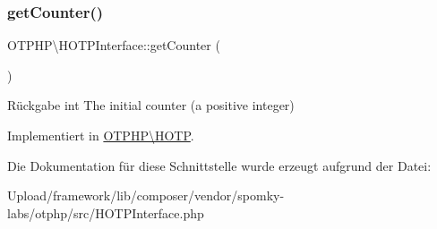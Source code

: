 \subsubsection{\texorpdfstring{get\+Counter()}{getCounter()}}
{\footnotesize\ttfamily O\+T\+P\+H\+P\textbackslash{}\+H\+O\+T\+P\+Interface\+::get\+Counter (\begin{DoxyParamCaption}{ }\end{DoxyParamCaption})}

\begin{DoxyReturn}{Rückgabe}
int The initial counter (a positive integer) 
\end{DoxyReturn}


Implementiert in \mbox{\hyperlink{class_o_t_p_h_p_1_1_h_o_t_p_a523cedac7ed950276daa4884fbb63230}{O\+T\+P\+H\+P\textbackslash{}\+H\+O\+TP}}.



Die Dokumentation für diese Schnittstelle wurde erzeugt aufgrund der Datei\+:\begin{DoxyCompactItemize}
\item 
Upload/framework/lib/composer/vendor/spomky-\/labs/otphp/src/H\+O\+T\+P\+Interface.\+php\end{DoxyCompactItemize}
